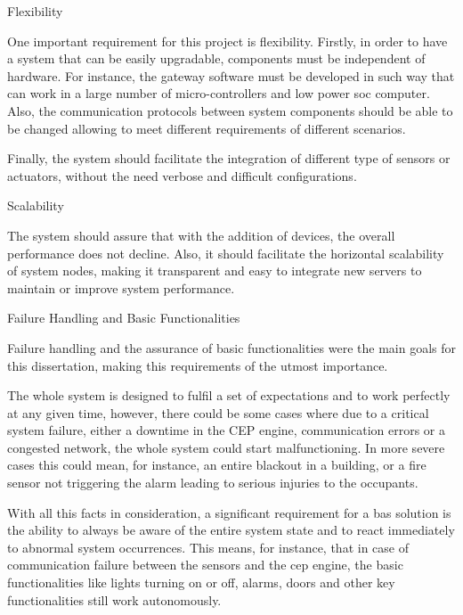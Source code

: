 \begin{Paragraph}{Flexibility}

One important requirement for this project is flexibility. Firstly, in order to have a system that can be easily upgradable, components must be independent of hardware. For instance, the gateway software must be developed in such way that can work in a large number of micro-controllers and  low power \ac{soc} computer. Also, the communication protocols between system components should be able to be changed allowing to meet different requirements of different scenarios. 


Finally, the system should facilitate the integration of different type of sensors or actuators, without the need verbose and difficult configurations.

\end{Paragraph}

\begin{Paragraph}{Scalability}

The system should assure that with the addition of devices, the overall performance does not decline. Also, it should facilitate the horizontal scalability of system nodes, making it transparent and easy to integrate new servers to maintain or improve system performance.


\end{Paragraph}

\begin{Paragraph}{Failure Handling and Basic Functionalities}
	
Failure handling and the assurance of basic functionalities were the main goals for this dissertation, making this requirements of the utmost importance.


The whole system is designed to fulfil a set of expectations and to work perfectly at any given time, however, there could be some cases where due to a critical system failure, either a downtime in the CEP engine, communication errors or a congested network, the whole system could start malfunctioning. In more severe cases this could mean, for instance, an entire blackout in a building, or a fire sensor not triggering the alarm leading to serious injuries to the occupants.

With all this facts in consideration, a significant requirement for a \ac{bas} solution is the ability to always be aware of the entire system state and to react immediately to abnormal system occurrences. This means, for instance, that in case of communication failure between the sensors and the \ac{cep} engine, the basic functionalities like lights turning on or off, alarms, doors and other key functionalities still work autonomously.
\end{Paragraph}

